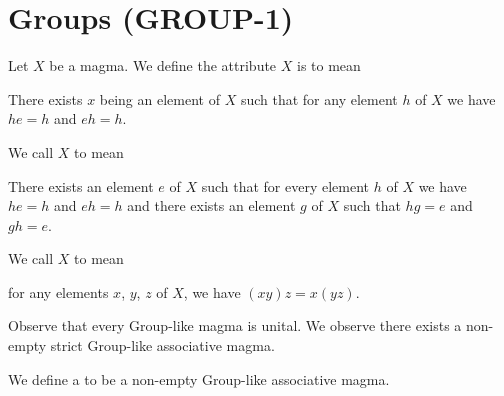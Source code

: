 \section{Groups (GROUP-1)}

\begin{definition}
Let $X$ be a magma. We define the attribute $X$ is  to
mean
\begin{defn}
\item There exists $x$ being an element of $X$ such that for any element
  $h$ of $X$ we have $he=h$ and $eh=h$.
\end{defn}
We call $X$  to mean
\begin{defn}
\item There exists an element $e$ of $X$ such that for every element $h$
  of $X$ we have $he=h$ and $eh=h$ and there exists an element $g$ of
  $X$ such that $hg=e$ and $gh=e$.
\end{defn}
We call $X$  to mean
\begin{defn}
\item for any elements $x$, $y$, $z$ of $X$, we have $(xy)z=x(yz)$.
\end{defn}
\end{definition}

Observe that every Group-like magma is unital. We observe there exists a
non-empty  strict Group-like associative magma.

\begin{definition}
We define a  to be a non-empty Group-like associative magma.
\end{definition}
